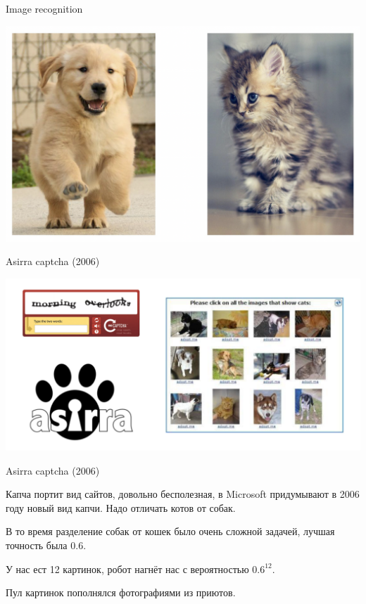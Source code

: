 \documentclass[notes,12pt, aspectratio=169]{beamer}
\newenvironment{wideitemize}{\itemize\addtolength{\itemsep}{10pt}}{\enditemize}
\begin{document}
\begin{frame}{Image recognition}
	\begin{center}
		\includegraphics[width=.8\linewidth]{img_rec_2.png}
	\end{center}
\end{frame}


\begin{frame}{Asirra captcha (2006)}
\begin{center}
	\includegraphics[width=.9\linewidth]{asira_capcha.png}
\end{center}
\end{frame}


\begin{frame}{Asirra captcha (2006)}
\begin{wideitemize}
	\item Капча портит вид сайтов, довольно бесполезная, в Microsoft придумывают в 2006 году новый вид капчи. Надо отличать котов от собак. 
	\item В то время разделение собак от кошек было очень сложной задачей, лучшая точность была $0.6$. 
	\item У нас ест 12 картинок, робот нагнёт нас с вероятностью $0.6^{12}$. 
	\item Пул картинок пополнялся фотографиями из приютов. 
\end{wideitemize} 
\end{frame}
\end{document}
